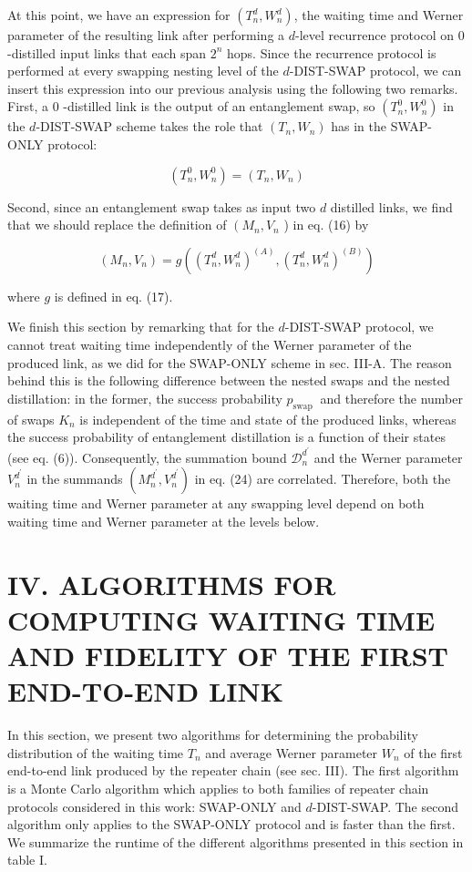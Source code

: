 \documentclass[10pt]{article}
\begin{document}
At this point, we have an expression for $\left(T_{n}^{d}, W_{n}^{d}\right)$, the waiting time and Werner parameter of the resulting link after performing a $d$-level recurrence protocol on 0 -distilled input links that each span $2^{n}$ hops. Since the recurrence protocol is performed at every swapping nesting level of the $d$-DIST-SWAP protocol, we can insert this expression into our previous analysis using the following two remarks. First, a 0 -distilled link is the output of an entanglement swap, so $\left(T_{n}^{0}, W_{n}^{0}\right)$ in the $d$-DIST-SWAP scheme takes the role that $\left(T_{n}, W_{n}\right)$ has in the SWAP-ONLY protocol:


\begin{equation*}
\left(T_{n}^{0}, W_{n}^{0}\right)=\left(T_{n}, W_{n}\right) \tag{25}
\end{equation*}


Second, since an entanglement swap takes as input two $d$ distilled links, we find that we should replace the definition of $\left(M_{n}, V_{n}\right.$ ) in eq. (16) by


\begin{equation*}
\left(M_{n}, V_{n}\right)=g\left(\left(T_{n}^{d}, W_{n}^{d}\right)^{(A)},\left(T_{n}^{d}, W_{n}^{d}\right)^{(B)}\right) \tag{26}
\end{equation*}


where $g$ is defined in eq. (17).

We finish this section by remarking that for the $d$-DIST-SWAP protocol, we cannot treat waiting time independently of the Werner parameter of the produced link, as we did for the SWAP-ONLY scheme in sec. III-A. The reason behind this is the following difference between the nested swaps and the nested distillation: in the former, the success probability $p_{\text {swap }}$ and therefore the number of swaps $K_{n}$ is independent of the time and state of the produced links, whereas the success probability of entanglement distillation is a function of their states (see eq. (6)). Consequently, the summation bound $\mathcal{D}_{n}^{d^{\prime}}$ and the Werner parameter $V_{n}^{d^{\prime}}$ in the summands $\left(M_{n}^{d^{\prime}}, V_{n}^{d^{\prime}}\right)$ in eq. (24) are correlated. Therefore, both the waiting time and Werner parameter at any swapping level depend on both waiting time and Werner parameter at the levels below.

\section*{IV. ALGORITHMS FOR COMPUTING WAITING TIME AND FIDELITY OF THE FIRST END-TO-END LINK}
In this section, we present two algorithms for determining the probability distribution of the waiting time $T_{n}$ and average Werner parameter $W_{n}$ of the first end-to-end link produced by the repeater chain (see sec. III). The first algorithm is a Monte Carlo algorithm which applies to both families of repeater chain protocols considered in this work: SWAP-ONLY and $d$-DIST-SWAP. The second algorithm only applies to the SWAP-ONLY protocol and is faster than the first. We summarize the runtime of the different algorithms presented in this section in table $\mathrm{I}$.
\end{document}
